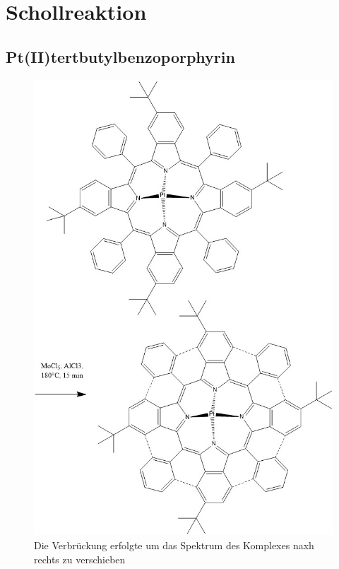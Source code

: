 \section{Schollreaktion}
\subsection{Pt(II)tertbutylbenzoporphyrin}
\begin{figure}
\centering
\includegraphics[scale=0.5]{graphics/PttBuTBPreaction}
Die Verbrückung erfolgte um das Spektrum des Komplexes naxh rechts zu verschieben
\end{figure}
